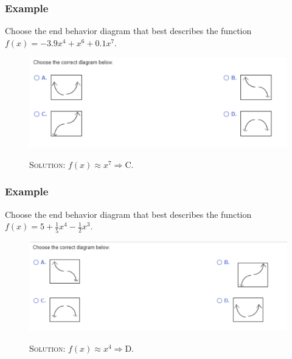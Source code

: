 \documentclass{beamer}
\begin{document}
\begin{frame}
	\frametitle{Example}
	\begin{enumerate}
		\item[]<1-> Choose the end behavior diagram that best describes the function $f(x)=-3.9x^{4}+x^{6}+0.1x^{7}$.  
		\item[]<2->
    \begin{figure}
      \begin{center}
        \caption{}
        \includegraphics[scale=0.35]{4_1_5.png}
      \end{center}
      \item[]<3-> \textsc{Solution:} $f(x) \approx x^{7} \Rightarrow $C. 
    \end{figure}
	\end{enumerate}
\end{frame}

\begin{frame}
	\frametitle{Example}
	\begin{enumerate}
		\item[]<1-> Choose the end behavior diagram that best describes the function $f(x)=5+\frac{1}{5}x^{4}-\frac{1}{2}x^{3}$.  
		\item[]<2->
    \begin{figure}
      \begin{center}
        \caption{}
        \includegraphics[scale=0.35]{4_1_6.png}
      \end{center}
      \item[]<3-> \textsc{Solution:} $f(x) \approx x^{4} \Rightarrow $D. 
    \end{figure}
	\end{enumerate}
\end{frame}
\end{document}
